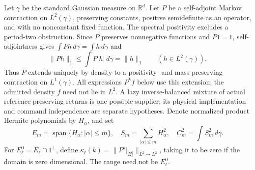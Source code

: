 \documentclass[11pt]{article}
\numberwithin{equation}{section}
\theoremstyle{definition}
\theoremstyle{remark}
\begin{document}
Let $\gamma$ be the standard Gaussian measure on $\mathbb R^d$. Let $P$ be a self-adjoint Markov contraction on $L^2(\gamma)$, preserving constants, positive semidefinite as an operator, and with no nonconstant fixed function. The spectral positivity excludes a period-two obstruction. Since $P$ preserves nonnegative functions and $P1=1$, self-adjointness gives $\int Ph\,d\gamma=\int h\,d\gamma$ and
\[
 \|Ph\|_1\leq\int P|h|\,d\gamma=\|h\|_1
 \qquad(h\in L^2(\gamma)).
\]
Thus $P$ extends uniquely by density to a positivity- and mass-preserving
contraction on $L^1(\gamma)$. All expressions $P^k f$ below use this
extension; the admitted density $f$ need not lie in $L^2$.
A lazy inverse-balanced mixture of actual reference-preserving returns
is one possible supplier; its physical implementation and command
independence are separate hypotheses. Denote normalized product Hermite
polynomials by $H_\alpha$, and set
\[
 E_m=\operatorname{span}\{H_\alpha:|\alpha|\le m\},\quad
 S_m=\sum_{|\alpha|\le m}H_\alpha^2,\quad C_m^2=\int S_m^2\,d\gamma.
\]
For $E_\ell^0=E_\ell\cap1^\perp$, define $\kappa_\ell(k)=\lVert P^k|_{E_\ell^0}\rVert_{L^2\to L^2}$, taking it to be zero if the domain is zero dimensional. The range need not be $E_\ell^0$.
\end{document}
